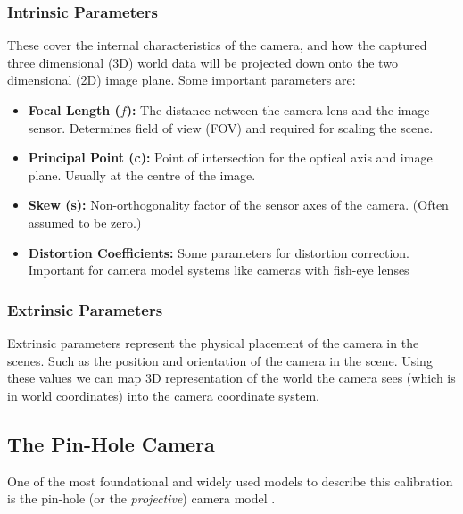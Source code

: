 \subsubsection{Intrinsic Parameters}
\label{subsubsec:intrinsic}

These cover the internal characteristics of the camera, and how the captured three dimensional (3D) world data will be projected down onto the two dimensional (2D) image plane.
Some important parameters are:

\begin{itemize}
  \item \textbf{Focal Length ($f$):} The distance netween the camera lens and the image sensor. Determines field of view (FOV) and required for scaling the scene.
  \item \textbf{Principal Point (c):} Point of intersection for the optical axis and image plane. Usually at the centre of the image.
  \item \textbf{Skew (s):} Non-orthogonality factor of the sensor axes of the camera. (Often assumed to be zero.)
  \item \textbf{Distortion Coefficients:} Some parameters for distortion correction. Important for camera model systems like cameras with fish-eye lenses \cite{king1989history}
\end{itemize}


\subsubsection{Extrinsic Parameters}
Extrinsic parameters represent the physical placement of the camera in the scenes. Such as the position and orientation of the camera in the scene. Using these values we can map  3D representation of the world the camera sees (which is in world coordinates) into the camera coordinate system.
\\

\subsection {The Pin-Hole Camera}
One of the most foundational and widely used models to describe this calibration is the pin-hole (or the  \emph{projective}) camera model \cite{solem2012programming}. 

